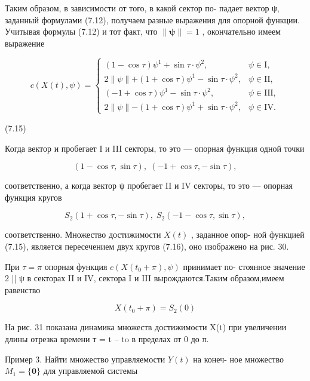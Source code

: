 \documentclass[8pt]{extarticle}
\begin{document}
Таким образом, в зависимости от того, в какой сектор по- падает вектор ψ, заданный формулами (7.12), получаем разные выражения для опорной функции. Учитывая формулы (7.12) и тот факт, что \(\parallel \mathbf{\psi }\parallel  = 1\) , окончательно имеем выражение

\[
c\left( {X\left( t\right) ,\psi }\right)  = \left\{  \begin{array}{cc} \left( {1 - \cos \tau }\right) {\psi }^{1} + \sin \tau  \cdot  {\psi }^{2}, & \psi  \in  \mathrm{I}, \\  2\parallel \psi \parallel  + \left( {1 + \cos \tau }\right) {\psi }^{1} - \sin \tau  \cdot  {\psi }^{2}, & \psi  \in  \mathrm{{II}}, \\  \left( {-1 + \cos \tau }\right) {\psi }^{1} - \sin \tau  \cdot  {\psi }^{2}, & \psi  \in  \mathrm{{III}}, \\  2\parallel \psi \parallel  - \left( {1 + \cos \tau }\right) {\psi }^{1} + \sin \tau  \cdot  {\psi }^{2}, & \psi  \in  \mathrm{{IV}}. \end{array}\right.
\]

(7.15)

Когда вектор и пробегает I и III секторы, то это — опорная функция одной точки

\[
\left( {1 - \cos \tau ,\sin \tau }\right) ,\;\left( {-1 + \cos \tau , - \sin \tau }\right) ,
\]

соответственно, а когда вектор ψ пробегает II и IV секторы, то это — опорная функция кругов

\[
{S}_{2}\left( {1 + \cos \tau , - \sin \tau }\right) ,\;{S}_{2}\left( {-1 - \cos \tau ,\sin \tau }\right) , \tag{7.16}
\]

соответственно. Множество достижимости \(X\left( t\right)\) , заданное опор- ной функцией (7.15), является пересечением двух кругов (7.16), оно изображено на рис. 30.

При \(\tau  = \pi\) опорная функция \(c\left( {X\left( {{t}_{0} + \pi }\right) ,\psi }\right)\) принимает по- стоянное значение 2 || ψ в секторах II и IV, сектора I и III вырождаются.Таким образом,имеем равенство

\[
X\left( {{t}_{0} + \pi }\right)  = {S}_{2}\left( 0\right)
\]

На рис. 31 показана динамика множеств достижимости X(t) при увеличении длины отрезка времени т = t – to в пределах от 0 до π.

Пример 3. Найти множество управляемости \(Y\left( t\right)\) на конеч- ное множество \({M}_{1} = \{ \mathbf{0}\}\) для управляемой системы
\end{document}
